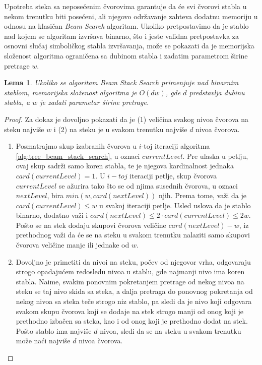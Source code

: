 \documentclass[a4paper]{article}
\newtheorem{lemma}[theorem]{Lema}
\begin{document}
Upotreba steka sa neposećenim čvorovima garantuje da će svi čvorovi stabla u nekom trenutku biti posećeni, ali njegovo održavanje zahteva dodatnu memoriju u odnosu na klasičan \textit{Beam Search} algoritam. Ukoliko pretpostavimo da je stablo nad kojem se algoritam izvršava binarno, što i jeste validna pretpostavka za osnovni slučaj simboličkog stabla izvršavanja, može se pokazati da je memorijska složenost algoritma ograničena sa dubinom stabla i zadatim parametrom širine pretrage $w$.

\begin{lemma}
Ukoliko se algoritam \textit{Beam Stack Search} primenjuje nad binarnim stablom, memorijska složenost algoritma je $O(dw)$, gde $d$ predstavlja dubinu stabla, a $w$ je zadati parametar širine pretrage.
\end{lemma}

\begin{proof}
Za dokaz je dovoljno pokazati da je (1) veličina svakog nivoa čvorova na steku najviše $w$ i (2) na steku je u svakom trenutku najviše $d$ nivoa čvorova.
\begin{enumerate}
    \item Posmatrajmo skup izabranih čvorova u $i$-toj iteraciji algoritma \ref{alg:tree_beam_stack_search}, u oznaci $currentLevel$. Pre ulaska u petlju, ovaj skup sadrži samo koren stabla, te je njegova kardinalnost jednaka $card(currentLevel) = 1$. U $i-toj$ iteraciji petlje, skup čvorova $currentLevel$ se ažurira tako što se od njima susednih čvorova, u oznaci $nextLevel$, bira $min(w, card(nextLevel))$ njih. Prema tome, važi da je $card(currentLevel) \leq w$ u svakoj iteraciji petlje. Usled uslova da je stablo binarno, dodatno važi i $card(nextLevel) \leq 2 \cdot card(currentLevel) \leq 2w$. Pošto se na stek dodaju skupovi čvorova veličine $card(nextLevel) - w$, iz prethodnog važi da će se na steku u svakom trenutku nalaziti samo skupovi čvorova veličine manje ili jednake od $w$.

    \item Dovoljno je primetiti da nivoi na steku, počev od njegovor vrha, odgovaraju strogo opadajućem redosledu nivoa u stablu, gde najmanji nivo ima koren stabla. Naime, svakim ponovnim pokretanjem pretrage od nekog nivoa na steku se taj nivo skida sa steka, a dalja pretraga do ponovnog pokretanja od nekog nivoa sa steka teče strogo niz stablo, pa sledi da je nivo koji odgovara svakom skupu čvorova koji se dodaje na stek strogo manji od onog koji je prethodno izbačen sa steka, kao i od onog koji je prethodno dodat na stek. Pošto stablo ima najviše $d$ nivoa, sledi da se na steku u svakom trenutku može naći najviše $d$ nivoa čvorova.
\end{enumerate}
\end{proof}
\end{document}
